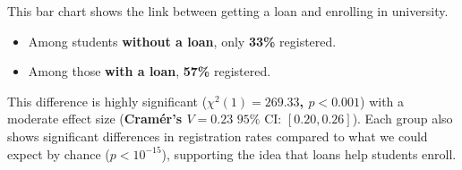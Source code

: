 \documentclass[
  6pt,
]{article}
\providecommand{\tightlist}{%
  \setlength{\itemsep}{0pt}\setlength{\parskip}{0pt}}\usepackage{longtable,booktabs,array}
\begin{document}
This bar chart shows the link between getting a loan and enrolling in
university.

\begin{itemize}
\tightlist
\item
  Among students \textbf{without a loan}, only \textbf{33\%} registered.
\item
  Among those \textbf{with a loan}, \textbf{57\%} registered.
\end{itemize}

This difference is highly significant (\textbf{\(\chi^2(1) = 269.33\),
\(p < 0.001\)}) with a moderate effect size (\textbf{Cramér's
\(V = 0.23\)} \(95\%\) CI: \([0.20, 0.26]\)). Each group also shows
significant differences in registration rates compared to what we could
expect by chance (\(p < 10^{-15}\)), supporting the idea that loans help
students enroll.
\end{document}
